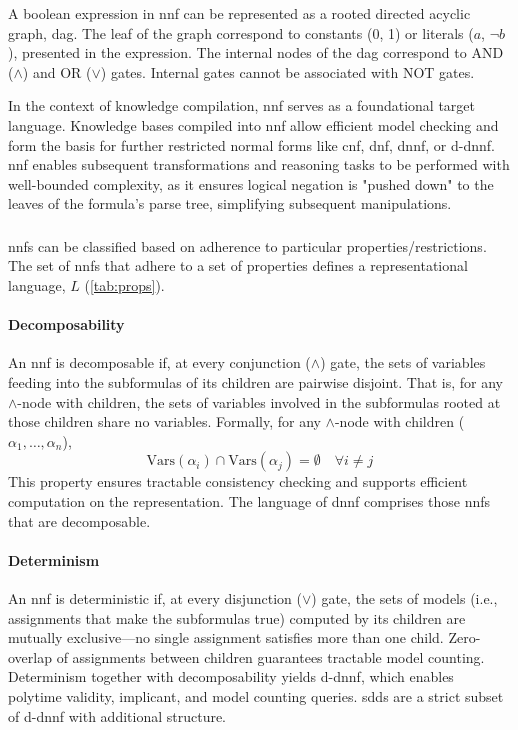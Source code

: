 A boolean expression in \acrshort{nnf} can be represented as a rooted directed acyclic graph, \acrshort{dag}. The leaf of the graph correspond to constants (0, 1) or literals ($a$, $\neg b$), presented in the expression. The internal nodes of the \acrshort{dag} correspond to AND ($\land$) and OR ($\lor$) gates. Internal gates cannot be associated with NOT gates.

In the context of knowledge compilation, \acrshort{nnf} serves as a foundational target language. Knowledge bases compiled into \acrshort{nnf} allow efficient model checking and form the basis for further restricted normal forms like \acrfull{cnf}, \acrfull{dnf}, \acrfull{dnnf}, or \acrfull{d-dnnf}. \acrshort{nnf} enables subsequent transformations and reasoning tasks to be performed with well-bounded complexity, as it ensures logical negation is "pushed down" to the leaves of the formula’s parse tree, simplifying subsequent manipulations.

\subsubsection{}
 \acrshort{nnf}s can be classified based on adherence to particular properties/restrictions. The set of  \acrshort{nnf}s that adhere to a set of properties defines a representational language, $L$ (\ref{tab:props}).

\paragraph{Decomposability}
An \acrshort{nnf} is decomposable if, at every conjunction ($\land$) gate, the sets of variables feeding into the subformulas of its children are pairwise disjoint. That is, for any $\wedge$-node with children, the sets of variables involved in the subformulas rooted at those children share no variables. 
Formally, for any $\wedge$-node with children ($\alpha_1, \ldots, \alpha_n$),
\[
\mathrm{Vars}(\alpha_i) \cap \mathrm{Vars}(\alpha_j) = \emptyset \quad \forall i \neq j
\]
This property ensures tractable consistency checking and supports efficient computation on the representation. The language of \acrshort{dnnf} comprises those \acrshort{nnf}s that are decomposable.

\paragraph{Determinism}
An \acrshort{nnf} is deterministic if, at every disjunction ($\lor$) gate, the sets of models (i.e., assignments that make the subformulas true) computed by its children are mutually exclusive—no single assignment satisfies more than one child. 
Zero-overlap of assignments between children guarantees tractable model counting. Determinism together with decomposability yields \acrfull{d-dnnf}, which enables polytime validity, implicant, and model counting queries. \acrfull{sdd}s are a strict subset of \acrshort{d-dnnf} with additional structure.

